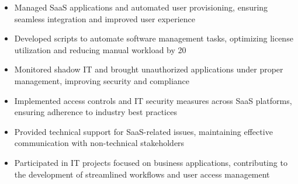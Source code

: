 \par\smallskip
\noindent
\begin{minipage}{20cm}
  \begin{minipage}{9.75cm}
    \begin{itemize}
      \item Managed SaaS applications and automated user provisioning, ensuring seamless integration and improved user experience
      \item Developed scripts to automate software management tasks, optimizing license utilization and reducing manual workload by 20%
      \item Monitored shadow IT and brought unauthorized applications under proper management, improving security and compliance
    \end{itemize}
  \end{minipage}
  \hfill
  \begin{minipage}{9.75cm}
    \begin{itemize}
      \item Implemented access controls and IT security measures across SaaS platforms, ensuring adherence to industry best practices
      \item Provided technical support for SaaS-related issues, maintaining effective communication with non-technical stakeholders
      \item Participated in IT projects focused on business applications, contributing to the development of streamlined workflows and user access management
    \end{itemize}
  \end{minipage}
\end{minipage}
\par\smallskip
\divider

